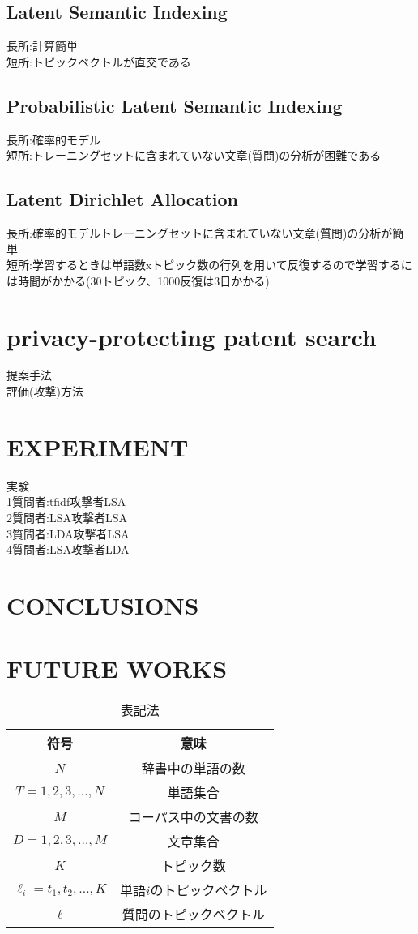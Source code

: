 \documentclass{jsarticle}
\theoremstyle{definition}
\begin{document}
\subsection{Latent Semantic Indexing}
長所:計算簡単\\
短所:トピックベクトルが直交である
\subsection{Probabilistic Latent Semantic Indexing}
長所:確率的モデル\\
短所:トレーニングセットに含まれていない文章(質問)の分析が困難である
\subsection{Latent Dirichlet Allocation}
長所:確率的モデルトレーニングセットに含まれていない文章(質問)の分析が簡単\\
短所:学習するときは単語数xトピック数の行列を用いて反復するので学習するには時間がかかる(30トピック、1000反復は3日かかる)
\section{privacy-protecting patent search}
提案手法\\
評価(攻撃)方法
\section{EXPERIMENT}
実験\\
1質問者:tfidf攻撃者LSA\\
2質問者:LSA攻撃者LSA\\
3質問者:LDA攻撃者LSA\\
4質問者:LSA攻撃者LDA
\section{CONCLUSIONS}
\section{FUTURE WORKS}

\begin{table}[!hbp]
\center
\begin{tabular}{|c|c|}
\hline
符号 & 意味 \\
\hline
$N$ & 辞書中の単語の数 \\
$T = {1,2,3, \dots ,N} $ & 単語集合 \\
$M$ & コーパス中の文書の数 \\
$D = {1,2,3, \dots ,M}$ & 文章集合 \\ 
$K$ & トピック数 \\
$\ell_i = {t_1,t_2,\dots,K} $ & 単語$i$のトピックベクトル \\
$\ell$ & 質問のトピックベクトル \\
\hline
\end{tabular}
\caption{表記法}
\end{table}
\end{document}
